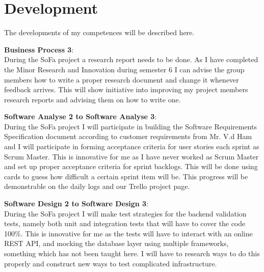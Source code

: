 \section{Development}
The developments of my competences will be described here.

\textbf{Business Process 3}:\\
During the SoFa project a research report needs to be done. As I have completed the Minor Research and Innovation during semester 6 I can advise the group members how to write a proper research document and change it whenever feedback arrives. This will show initiative into improving my project members research reports and advising them on how to write one.

\textbf{Software Analyse 2 to Software Analyse 3}:\\
During the SoFa project I will participate in building the Software Requirements Specification document according to customer requirements from Mr. V.d Ham  and I will participate in forming acceptance criteria for user stories each sprint as Scrum Master. This is innovative for me as I have never worked as Scrum Master and set up proper acceptance criteria for sprint backlogs. This will be done using cards to guess how difficult a certain sprint item will be. This progress will be demonstrable on the daily logs and our Trello project page.

\textbf{Software Design 2 to Software Design 3}:\\
During the SoFa project I will make test strategies for the backend validation tests, namely both unit and integration tests that will have to cover the code 100\%. This is innovative for me as the tests will have to interact with an online REST API, and mocking the database layer using multiple frameworks, something which has not been taught here. I will have to research ways to do this properly and construct new ways to test complicated infrastructure.